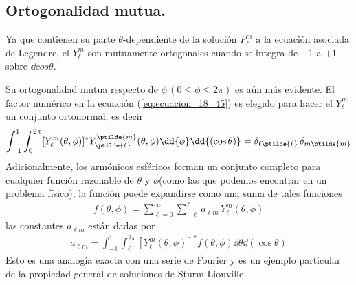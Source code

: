 \subsection{Ortogonalidad mutua.}
Ya que contienen su parte $\theta$-dependiente de la solución $P_{\ell}^{m}$ a la ecuación asociada de Legendre, el $Y_{\ell}^{m}$ son mutuamente ortogonales cuando se integra de $-1$ a $+1$ sobre $\dd{cos \theta}$.
\par
Su ortogonalidad mutua respecto de $\phi \, (0 \leq \phi \leq 2 \pi)$ es aún más evidente. El factor numérico en la ecuación (\ref{eq:ecuacion_18_45}) es elegido para hacer el $Y_{\ell}^{m}$ un conjunto ortonormal, es decir
\begin{align}
\int_{-1}^{1} \int_{0}^{2 \pi} [ Y_{\ell}^{m} (\theta, \phi) ]^{*} Y_{\ptilde{\ell}}^{\ptilde{m}} (\theta, \phi) \dd{\phi} \dd{(\cos \theta)} = \delta_{\ell \ptilde{\ell}} \,  \delta_{m \ptilde{m}}
\label{eq:ecuacion_18_46}
\end{align}
Adicionalmente, los armónicos esféricos forman un conjunto completo para cualquier función razonable de $\theta$ y $\phi$(como las que podemos encontrar en un problema físico), la función puede expandirse como una suma de tales funciones
\begin{align}
f(\theta, \phi) = \sum_{\ell=0}^{\infty} \sum_{-\ell}^{\ell} a_{\ell m} \, Y_{\ell}^{m} (\theta, \phi)
\label{eq:ecuacion_18_47}
\end{align}
las constantes $a_{\ell m}$ están dadas por
\begin{align}
a_{\ell m} = \int_{-1}^{1} \int_{0}^{2 \pi} [ Y_{\ell}^{m} (\theta, \phi) ]^{*} f (\theta, \phi) \dd{\theta} \dd{(\cos \theta)}
\label{eq:ecuacion_048}
\end{align}
Esto es una analogía exacta con una serie de Fourier y es un ejemplo particular de la propiedad general de soluciones de Sturm-Liouville.
